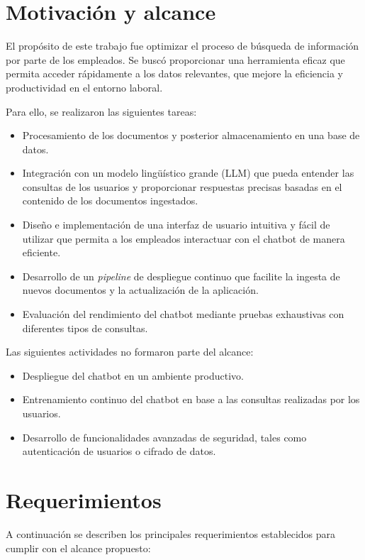 \section{Motivación y alcance}

El propósito de este trabajo fue optimizar el proceso de búsqueda de información por parte de los empleados. Se buscó
proporcionar una herramienta eficaz que permita acceder rápidamente a los datos relevantes, que mejore la eficiencia y 
productividad en el entorno laboral.

Para ello, se realizaron las siguientes tareas:

\begin{itemize}
	\item Procesamiento de los documentos y posterior almacenamiento en una base de datos.
	\item Integración con un modelo lingüístico grande (LLM) que pueda entender las consultas de los usuarios y proporcionar respuestas precisas basadas en el contenido de los documentos ingestados.
	\item Diseño e implementación de una interfaz de usuario intuitiva y fácil de utilizar que permita a los empleados interactuar con el chatbot de manera eficiente.
	\item Desarrollo de un \textit{pipeline} de despliegue continuo que facilite la ingesta de nuevos documentos y la actualización de la aplicación.
  \item Evaluación del rendimiento del chatbot mediante pruebas exhaustivas con diferentes tipos de consultas.
\end{itemize}

Las siguientes actividades no formaron parte del alcance:

\begin{itemize}
	\item Despliegue del chatbot en un ambiente productivo.
	\item Entrenamiento continuo del chatbot en base a las consultas realizadas por los usuarios.
	\item Desarrollo de funcionalidades avanzadas de seguridad, tales como autenticación de usuarios o cifrado de datos.
\end{itemize}

\section{Requerimientos}

A continuación se describen los principales requerimientos establecidos para cumplir
con el alcance propuesto: